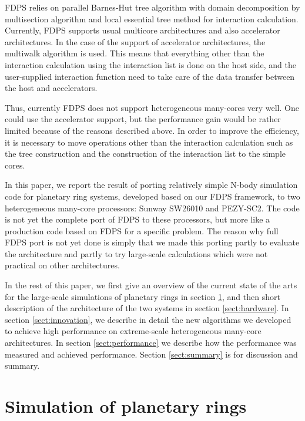 \documentclass[Afour,sageh,times]{sagej}
\begin{document}
FDPS relies on parallel Barnes-Hut tree algorithm with domain
decomposition by multisection algorithm and local essential tree
method \citep{Makino2004} for interaction calculation. Currently, FDPS
supports usual multicore architectures and also accelerator
architectures. In the case of the support of accelerator
architectures, the multiwalk algorithm \citep{Hamadaetal2009} is
used. This means that everything other than the interaction
calculation using the interaction list is done on the host side, and
the user-supplied interaction function need to take care of the data
transfer between the host and accelerators.

Thus, currently FDPS does not support heterogeneous many-cores very
well. One could use the accelerator support, but the performance gain
would be rather limited because of the reasons described above.  In
order to improve the efficiency, it is necessary to move operations
other than the interaction calculation such as the tree construction
and the construction of the interaction list to the simple cores.

In this paper, we report the result of porting relatively simple
N-body simulation code for planetary ring systems, developed based on
our FDPS framework, to two heterogeneous many-core processors: Sunway
SW26010 and PEZY-SC2. The code is not yet the complete port of FDPS to
these processors, but more like a production code based on FDPS for a
specific problem. The reason why full FDPS port is not yet done is
simply that we made this porting partly to evaluate the architecture
and partly to try large-scale calculations which were not practical on
other architectures.



In the rest of this paper, we first give an overview of the current
state of the arts for the large-scale simulations of planetary rings
in section \ref{sect:rings}, and then short description of the
architecture of the two systems in section \ref{sect:hardware}.  In
section \ref{sect:innovation}, we describe in detail the new
algorithms we developed to achieve high performance on extreme-scale
heterogeneous many-core architectures.  In section
\ref{sect:performance} we describe how the performance was measured
and achieved performance.  Section \ref{sect:summary} is for
discussion and summary.

\section{Simulation of planetary rings}
\label{sect:rings}
\end{document}
